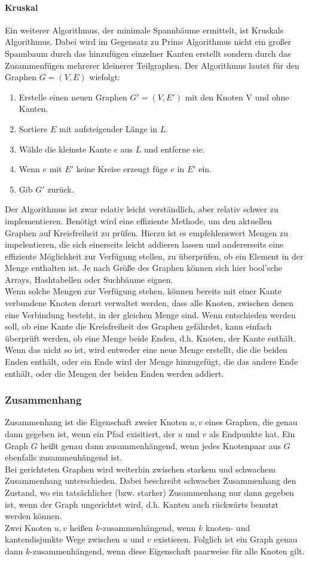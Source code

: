 \documentclass{article}
\begin{document}
\paragraph{Kruskal}
Ein weiterer Algorithmus, der minimale Spannbäume ermittelt, ist Kruskals Algorithmus. Dabei wird im Gegensatz zu Prims Algorithmus nicht ein großer Spannbaum durch das hinzufügen einzelner Kanten erstellt sondern durch das Zusammenfügen mehrerer kleinerer Teilgraphen. Der Algorithmus lautet für den Graphen $G=(V,E)$ wiefolgt:
\begin{enumerate}
    \item Erstelle einen neuen Graphen $G'=(V, E')$ mit den Knoten V und ohne Kanten.
    \item Sortiere $E$ mit aufsteigender Länge in $L$.
    \item Wähle die kleinste Kante $e$ aus $L$ und entferne sie.
    \item Wenn $e$ mit $E'$ keine Kreise erzeugt füge $e$ in $E'$ ein.
    \item Gib $G'$ zurück.
\end{enumerate}
Der Algorithmus ist zwar relativ leicht verständlich, aber relativ schwer zu implementieren. Benötigt wird eine effiziente Methode, um den aktuellen Graphen auf Kreisfreiheit zu prüfen. Hierzu ist es empfehlenswert Mengen zu impelentieren, die sich einerseits leicht addieren lassen und andererseits eine effiziente Möglichkeit zur Verfügung stellen, zu überprüfen, ob ein Element in der Menge enthalten ist. Je nach Größe des Graphen können sich hier bool'sche Arrays, Hashtabellen oder Suchbäume eignen.\\
Wenn solche Mengen zur Verfügung stehen, können bereits mit einer Kante verbundene Knoten derart verwaltet werden, dass alle Knoten, zwischen denen eine Verbindung besteht, in der gleichen Menge sind. Wenn entschieden werden soll, ob eine Kante die Kreisfreiheit des Graphen gefährdet, kann einfach überprüft werden, ob eine Menge beide Enden, d.h. Knoten, der Kante enthält. Wenn das nicht so ist, wird entweder eine neue Menge erstellt, die die beiden Enden enthält, oder ein Ende wird der Menge hinzugefügt, die das andere Ende enthält, oder die Mengen der beiden Enden werden addiert.
\subsubsection{Zusammenhang}
Zusammenhang ist die Eigenschaft zweier Knoten $u, v$ eines Graphen, die genau dann gegeben ist, wenn ein Pfad exisitiert, der $u$ und $v$ als Endpunkte hat. Ein Graph $G$ heißt genau dann zusammenhängend, wenn jedes Knotenpaar aus $G$ ebenfalls zusammenhängend ist.\\
Bei gerichteten Graphen wird weiterhin zwischen starkem und schwachem Zusammenhang unterschieden. Dabei beschreibt schwacher Zusammenhang den Zustand, wo ein tatsächlicher (bzw. starker) Zusammenhang nur dann gegeben ist, wenn der Graph ungerichtet wird, d.h. Kanten auch rückwärts benutzt werden können.\\
Zwei Knoten $u, v$ heißen $k$-zusammenhängend, wenn $k$ knoten- und kantendisjunkte Wege zwischen $u$ und $v$ existieren. Folglich ist ein Graph genau dann $k$-zusammenhängend, wenn diese Eigenschaft paarweise für alle Knoten gilt.
\end{document}
